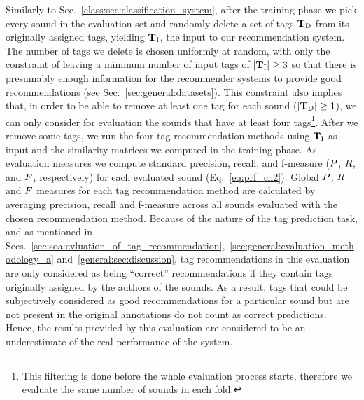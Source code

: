 Similarly to Sec.~\ref{class:sec:classification_system}, after the training phase we pick every sound in the evaluation set and randomly delete a set of tags $\mathbf{T}_{\text{D}}$ from its originally assigned tags, yielding $\mathbf{T}_{\text{I}}$, the input to our recommendation system. The number of tags we delete is chosen uniformly at random, with only the constraint of leaving a minimum number of input tags of $|\mathbf{T}_{\text{I}}| \geq 3$ so that there is presumably enough information for the recommender systems to provide good recommendations (see Sec.~\ref{sec:general:datasets}). This constraint also implies that, in order to be able to remove at least one tag for each sound ($|\mathbf{T}_{\text{D}}| \geq 1$), we can only consider for evaluation the sounds that have at least four tags\footnote{This filtering is done before the whole evaluation process starts, therefore we evaluate the same number of sounds in each fold.}. After we remove some tags, we run the four tag recommendation methods using $\mathbf{T}_{\text{I}}$ as input and the similarity matrices we computed in the training phase. 
As evaluation measures we compute standard precision, recall, and f-measure ($P$, $R$, and $F$, respectively) for each evaluated sound (Eq.~\ref{eq:prf_ch2}).
Global $P$, $R$ and $F$ measures for each tag recommendation method are calculated by averaging precision, recall and f-measure across all sounds evaluated with the chosen recommendation method.
Because of the nature of the tag prediction task, and as mentioned in Secs.~\ref{sec:soa:evluation_of_tag_recommendation},~\ref{sec:general:evaluation_methodology_a} and~\ref{general:sec:discussion}, tag recommendations in this evaluation are only considered as being ``correct'' recommendations if they contain tags originally assigned by the authors of the sounds. As a result, tags that could be subjectively considered as good recommendations for a particular sound but are not present in the original annotations do not count as correct predictions. Hence, the results provided by this evaluation are considered to be an underestimate of the real performance of the system.

